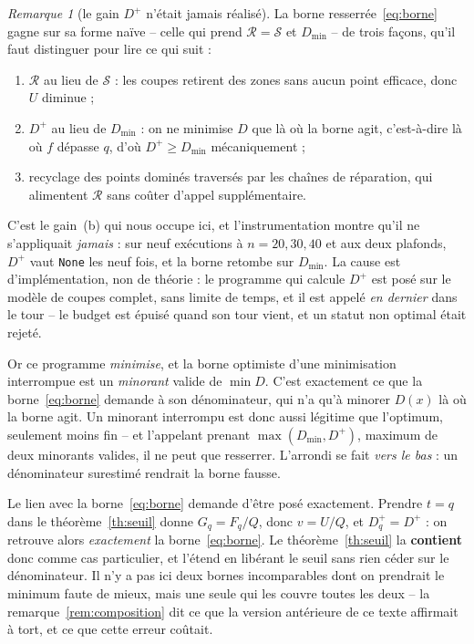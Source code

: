 \documentclass[11pt,a4paper]{article}
\theoremstyle{plain}
\theoremstyle{remark}
\newtheorem{remark}{Remarque}
\newcommand{\Scal}{\mathcal{S}}
\newcommand{\Rcal}{\mathcal{R}}
\begin{document}
\begin{remark}[le gain $D^{+}$ n'était jamais réalisé]
La borne resserrée~\eqref{eq:borne} gagne sur sa forme naïve
-- celle qui prend $\Rcal=\Scal$ et $D_{\min}$ -- de trois façons, qu'il
faut distinguer pour lire ce qui suit :
\begin{enumerate}[label=(\alph*),leftmargin=*,itemsep=1pt]
\item $\Rcal$ au lieu de $\Scal$ : les coupes retirent des zones sans aucun
  point efficace, donc $U$ diminue ;
\item $D^{+}$ au lieu de $D_{\min}$ : on ne minimise $D$ que là où la borne
  agit, c'est-à-dire là où $f$ dépasse $q$, d'où $D^{+}\ge D_{\min}$
  mécaniquement ;
\item recyclage des points dominés traversés par les chaînes de réparation,
  qui alimentent $\Rcal$ sans coûter d'appel supplémentaire.
\end{enumerate}
C'est le gain~(b) qui nous occupe ici, et l'instrumentation montre qu'il ne
s'appliquait \emph{jamais} : sur neuf exécutions à $n=20,30,40$ et aux deux plafonds,
$D^{+}$ vaut \texttt{None} les neuf fois, et la borne retombe sur
$D_{\min}$. La cause est d'implémentation, non de théorie : le programme qui
calcule $D^{+}$ est posé sur le modèle de coupes complet, sans limite de
temps, et il est appelé \emph{en dernier} dans le tour -- le budget est
épuisé quand son tour vient, et un statut non optimal était rejeté.

Or ce programme \emph{minimise}, et la borne optimiste d'une minimisation
interrompue est un \emph{minorant} valide de $\min D$. C'est exactement ce
que la borne~\eqref{eq:borne} demande à son dénominateur, qui n'a qu'à
minorer $D(x)$
là où la borne agit. Un minorant interrompu est donc aussi légitime que
l'optimum, seulement moins fin -- et l'appelant prenant
$\max(D_{\min},D^{+})$, maximum de deux minorants valides, il ne peut que
resserrer. L'arrondi se fait \emph{vers le bas} : un dénominateur surestimé
rendrait la borne fausse.
\end{remark}

Le lien avec la borne~\eqref{eq:borne} demande d'être posé exactement.
Prendre $t=q$ dans le théorème~\ref{th:seuil} donne $G_q=F_q/Q$, donc
$v=U/Q$, et $D^{+}_{q}=D^{+}$ : on retrouve alors \emph{exactement}
la borne~\eqref{eq:borne}. Le théorème~\ref{th:seuil} la \textbf{contient}
donc comme cas particulier, et l'étend en libérant le seuil sans rien céder
sur le dénominateur. Il n'y a pas ici deux bornes incomparables dont on
prendrait le minimum faute de mieux, mais une seule qui les couvre toutes
les deux -- la remarque~\ref{rem:composition} dit ce que la version
antérieure de ce texte affirmait à tort, et ce que cette erreur coûtait.
\end{document}
